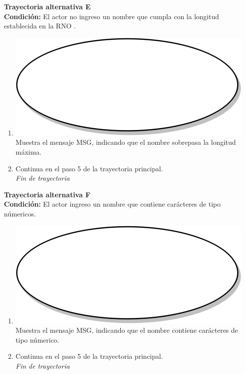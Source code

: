 \textbf{Trayectoria alternativa E} \label{cu2_ta_e}\\
\textbf{Condición:} El actor no ingreso un nombre que cumpla con la longitud establecida en la RNO .\\
 \begin{enumerate}[label=E\arabic*]
    \item {\includegraphics[scale=.05]{Capitulo3/img/proceso.png} Muestra el mensaje MSG, indicando que el nombre sobrepasa la longitud máxima.}
    \item {Continua en el paso 5 de la trayectoria principal.} \\
    \textit{Fin de trayectoria} \\
\end{enumerate}

\textbf{Trayectoria alternativa F} \label{cu2_ta_f}\\
\textbf{Condición:} El actor ingreso un nombre que contiene carácteres de tipo númericos.\\
 \begin{enumerate}[label=F\arabic*]
    \item {\includegraphics[scale=.05]{Capitulo3/img/proceso.png} Muestra el mensaje MSG, indicando que el nombre contiene carácteres de tipo númerico.}
    \item {Continua en el paso 5 de la trayectoria principal.} \\
    \textit{Fin de trayectoria} \\
\end{enumerate}

